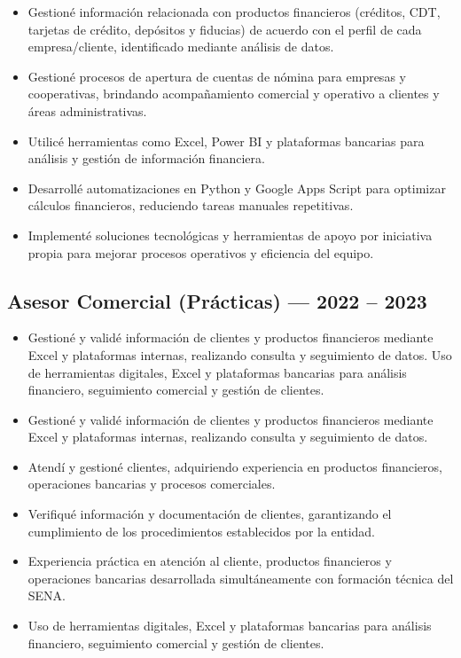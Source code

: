 \documentclass[10pt,a4paper]{article}
\begin{document}
\begin{itemize}
\item Gestioné información relacionada con productos financieros (créditos, CDT, tarjetas de crédito, depósitos y fiducias) de acuerdo con el perfil de cada empresa/cliente, identificado mediante análisis de datos.
\item Gestioné procesos de apertura de cuentas de nómina para empresas y cooperativas, brindando acompañamiento comercial y operativo a clientes y áreas administrativas.
\item Utilicé herramientas como Excel, Power BI y plataformas bancarias para análisis y gestión de información financiera.
\item Desarrollé automatizaciones en Python y Google Apps Script para optimizar cálculos financieros, reduciendo tareas manuales repetitivas.
\item Implementé soluciones tecnológicas y herramientas de apoyo por iniciativa propia para mejorar procesos operativos y eficiencia del equipo.
\end{itemize}

\subsection*{Asesor Comercial (Prácticas) — 2022 -- 2023}
\begin{itemize}
\item Gestioné y validé información de clientes y productos financieros mediante 
Excel y plataformas internas, realizando consulta y seguimiento de datos. Uso de herramientas digitales, Excel y plataformas bancarias para análisis financiero, seguimiento comercial y gestión de clientes.
\item Gestioné y validé información de clientes y productos financieros mediante 
Excel y plataformas internas, realizando consulta y seguimiento de datos.
\item Atendí y gestioné clientes, adquiriendo experiencia en productos financieros, operaciones bancarias y procesos comerciales.
\item Verifiqué información y documentación de clientes, garantizando el cumplimiento de los procedimientos establecidos por la entidad.
\item Experiencia práctica en atención al cliente, productos financieros y operaciones bancarias desarrollada simultáneamente con formación técnica del SENA.
\item Uso de herramientas digitales, Excel y plataformas bancarias para análisis financiero, seguimiento comercial y gestión de clientes.
\end{itemize}
\end{document}
